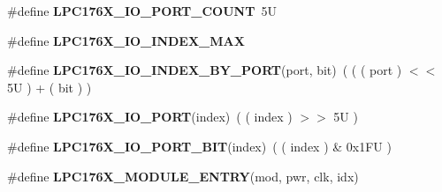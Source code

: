 \begin{DoxyCompactItemize}
\item 
\mbox{\label{io-defs_8h_a223b8a66a1a814ba993252c6408b8624}} 
\#define {\bfseries L\+P\+C176\+X\+\_\+\+I\+O\+\_\+\+P\+O\+R\+T\+\_\+\+C\+O\+U\+NT}~5U
\item 
\#define {\bfseries L\+P\+C176\+X\+\_\+\+I\+O\+\_\+\+I\+N\+D\+E\+X\+\_\+\+M\+AX}
\item 
\mbox{\label{io-defs_8h_a76020f04f2a703815d929c1e69f7fee6}} 
\#define {\bfseries L\+P\+C176\+X\+\_\+\+I\+O\+\_\+\+I\+N\+D\+E\+X\+\_\+\+B\+Y\+\_\+\+P\+O\+RT}(port,  bit)~( ( ( port ) $<$$<$ 5\+U ) + ( bit ) )
\item 
\mbox{\label{io-defs_8h_a209b3d82099b9e24a3909d5b7f52d1bc}} 
\#define {\bfseries L\+P\+C176\+X\+\_\+\+I\+O\+\_\+\+P\+O\+RT}(index)~( ( index ) $>$$>$ 5\+U )
\item 
\mbox{\label{io-defs_8h_a90b079f38f90716267c2fd7b4b875b2a}} 
\#define {\bfseries L\+P\+C176\+X\+\_\+\+I\+O\+\_\+\+P\+O\+R\+T\+\_\+\+B\+IT}(index)~( ( index ) \& 0x1\+F\+U )
\item 
\#define {\bfseries L\+P\+C176\+X\+\_\+\+M\+O\+D\+U\+L\+E\+\_\+\+E\+N\+T\+RY}(mod,  pwr,  clk,  idx)
\end{DoxyCompactItemize}

